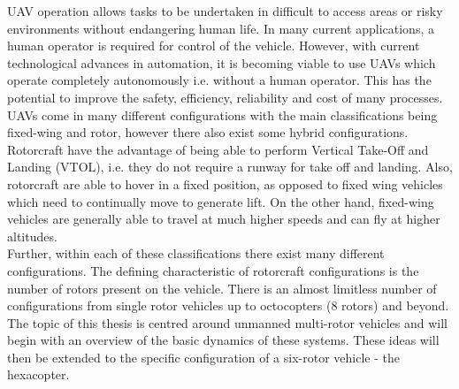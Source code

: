 UAV operation allows tasks to be undertaken in difficult to access areas or risky environments without endangering human life. In many current applications, a human operator is required for control of the vehicle. However, with current technological advances in automation, it is becoming viable to use UAVs which operate completely autonomously i.e. without a human operator. This has the potential to improve the safety, efficiency, reliability and cost of many processes.\\

UAVs come in many different configurations with the main classifications being fixed-wing and rotor, however there also exist some hybrid configurations. Rotorcraft have the advantage of being able to perform Vertical Take-Off and Landing (VTOL), i.e. they do not require a runway for take off and landing. Also, rotorcraft are able to hover in a fixed position, as opposed to fixed wing vehicles which need to continually move to generate lift. On the other hand, fixed-wing vehicles are generally able to travel at much higher speeds and can fly at higher altitudes. \\

Further, within each of these classifications there exist many different configurations. The defining characteristic of rotorcraft configurations is the number of rotors present on the vehicle. There is an almost limitless number of configurations from single rotor vehicles up to octocopters (8 rotors) and beyond. The topic of this thesis is centred around unmanned multi-rotor vehicles and will begin with an overview of the basic dynamics of these systems. These ideas will then be extended to the specific configuration of a six-rotor vehicle - the hexacopter.


